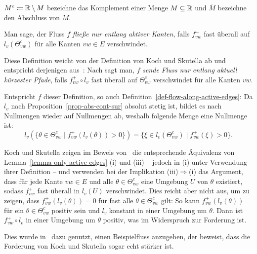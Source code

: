 \begin{notation}
	 $M^c\coloneq \mathbb{R}\setminus M$ bezeichne das Komplement einer Menge $M\subseteq\mathbb{R}$ und $\overline{M}$ bezeichne den Abschluss von $M$.
\end{notation}

\begin{definition}\label{def-flow-along-active-edges}
	Man sage, der Fluss $f$ \emph{fließe nur entlang aktiver Kanten}, falls $f_{vw}^+$ fast überall auf $l_v(\Theta_{vw}^c)$ für alle Kanten $vw\in E$ verschwindet.
\end{definition}

\begin{remark}
	Diese Definition weicht von der Definition von Koch und Skutella ab und entspricht derjenigen aus~\cite[Definition 1]{Cominetti2015}:
	Nach \cite[Definition 2]{Koch2011} sagt man, $f$ \emph{sende Fluss nur entlang aktuell kürzester Pfade}, falls $f_{vw}^+\circ l_v$ fast überall auf $\Theta_{vw}^c$ verschwindet für alle Kanten $vw$.

	Entspricht $f$ dieser Definition, so auch Definition~\ref{def-flow-along-active-edges}: 
	Da $l_v$ nach Proposi\-tion~\ref{prop-abs-cont-sur} absolut stetig ist, bildet es nach~\cite[Kap. VII, Aufgabe 4.9]{Elstrodt2011} Nullmengen wieder auf Nullmengen ab, weshalb folgende Menge eine Nullmenge ist: \[ l_v(\{ \theta \in \Theta_{vw}^c \mid f_{vw}^+ (l_v(\theta)) > 0 \}) = \{ \xi \in l_v(\Theta_{vw}^c) \mid f_{vw}^+ (\xi) > 0 \}. \]
	 
	Koch und Skutella zeigen im Beweis von~\cite[Lemma 1]{Koch2011} die entsprechende Äquivalenz von Lemma~\ref{lemma-only-active-edges} (i) und (iii) -- jedoch in (i) unter Verwendung ihrer Definition -- und
	verwenden bei der Implikation (iii)$\Rightarrow$(i) das Argument, dass für jede Kante $vw\in E$ und alle $\theta\in \Theta_{vw}^c$ eine Umgebung $U$ von $\theta$ existiert, sodass $f_{vw}^+$ fast überall in $l_v(U)$ verschwindet.
	Dies reicht aber nicht aus, um zu zeigen, dass $f_{vw}^+(l_v(\theta))=0$ für fast alle $\theta\in\Theta_{vw}^c$ gilt:
	So kann $f_{vw}^+(l_v(\theta))$ für ein $\theta\in\Theta_{vw}^c$ positiv sein und $l_v$ konstant in einer Umgebung um $\theta$.
	Dann ist $f_{vw}^+ \circ l_v$ in einer Umgebung um $\theta$ positiv, was im Widerspruch zur Forderung ist.
	
	Dies wurde in~\cite[Example 2]{Cominetti2015} dazu genutzt, einen Beispielfluss anzugeben, der beweist, dass die Forderung von Koch und Skutella sogar echt stärker ist.
\end{remark}

